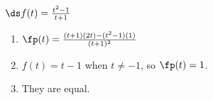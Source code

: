 {$\ds f(t)= \frac{t^2-1}{t+1}$
}
{\begin{enumerate}
\item		$\fp(t) = \frac{(t+1)(2t) - (t^2-1)(1)}{(t+1)^2}$
\item		$f(t) = t-1$ when $t\neq -1$, so $\fp(t) = 1$.
\item		They are equal.
\end{enumerate}
}
